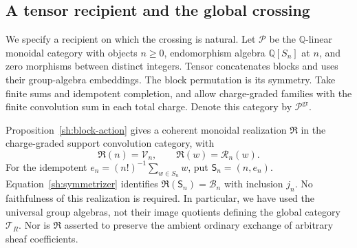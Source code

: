 \subsection{A tensor recipient and the global crossing}

We specify a recipient on which the crossing is natural. Let
$\mathcal P$ be the $\mathbb Q$-linear monoidal category with
objects $n\geq0$, endomorphism algebra $\mathbb Q[S_n]$ at $n$,
and zero morphisms between distinct integers. Tensor concatenates
blocks and uses their group-algebra embeddings. The block
permutation is its symmetry. Take finite sums and idempotent
completion, and allow charge-graded families with the finite
convolution sum in each total charge. Denote this category by
$\mathcal P^{\mathrm{gr}}$.

Proposition~\ref{sh:block-action} gives a coherent monoidal
realization $\mathfrak R$ in the charge-graded support convolution
category, with
\[
 \mathfrak R(n)=\mathcal V_n,
 \qquad \mathfrak R(w)=\mathcal R_n(w).
\]
For the idempotent
$e_n=(n!)^{-1}\sum_{w\in S_n}w$, put $\mathsf S_n=(n,e_n)$.
Equation~\eqref{sh:symmetrizer} identifies
$\mathfrak R(\mathsf S_n)=\mathcal B_n$ with inclusion $j_n$.
No faithfulness of this realization is required. In particular,
we have used the universal group algebras, not their image
quotients defining the global category $\mathcal T_R$.
Nor is $\mathfrak R$ asserted to preserve the ambient ordinary
exchange of arbitrary sheaf coefficients.

